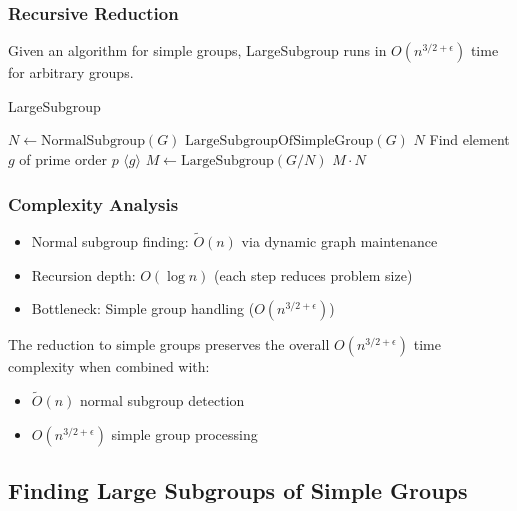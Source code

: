 \documentclass[sigconf]{acmart}
\begin{document}
\subsubsection{Recursive Reduction}
\begin{lemma}[6.2]
Given an algorithm for simple groups, LargeSubgroup runs in \( O(n^{3/2+\epsilon}) \) time for arbitrary groups.
\end{lemma}

\begin{algorithm}[H]
\caption{LargeSubgroup}
\begin{algorithmic}[1]
\STATE \( N \gets \text{NormalSubgroup}(G) \)
    \RETURN \(\text{LargeSubgroupOfSimpleGroup}(G)\)
    \RETURN \( N \)
    \STATE Find element \( g \) of prime order \( p \)
    \RETURN \( \langle g \rangle \)
\ELSE
    \STATE \( M \gets \text{LargeSubgroup}(G/N) \)
    \RETURN \( M \cdot N \)
\ENDIF
\end{algorithmic}
\end{algorithm}

\subsubsection{Complexity Analysis}
\begin{itemize}
    \item Normal subgroup finding: \( \widetilde{O}(n) \) via dynamic graph maintenance
    \item Recursion depth: \( O(\log n) \) (each step reduces problem size)
    \item Bottleneck: Simple group handling (\( O(n^{3/2+\epsilon}) \))
\end{itemize}

\begin{theorem}
The reduction to simple groups preserves the overall \( O(n^{3/2+\epsilon}) \) time complexity when combined with:
\begin{itemize}
    \item \( \widetilde{O}(n) \) normal subgroup detection
    \item \( O(n^{3/2+\epsilon}) \) simple group processing
\end{itemize}
\end{theorem}

\subsection{Finding Large Subgroups of Simple Groups}
\label{sec:simple-subgroups}
\end{document}
